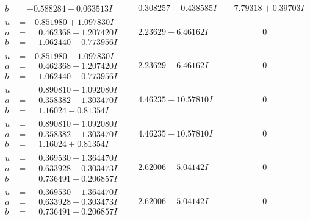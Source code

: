 \documentclass[1p]{elsarticle_modified}
\theoremstyle{definition}
\begin{document}
$$\begin{array}{c|c|c}
\begin{aligned}
b &= -0.588284 - 0.063513 I\end{aligned}
 & \phantom{-}0.308257 - 0.438585 I & \phantom{-}7.79318 + 0.39703 I \\ \hline\begin{aligned}
u &= -0.851980 + 1.097830 I \\
a &= \phantom{-}0.462368 - 1.207420 I \\
b &= \phantom{-}1.062440 + 0.773956 I\end{aligned}
 & \phantom{-}2.23629 - 6.46162 I & \phantom{-0.000000 } 0 \\ \hline\begin{aligned}
u &= -0.851980 - 1.097830 I \\
a &= \phantom{-}0.462368 + 1.207420 I \\
b &= \phantom{-}1.062440 - 0.773956 I\end{aligned}
 & \phantom{-}2.23629 + 6.46162 I & \phantom{-0.000000 } 0 \\ \hline\begin{aligned}
u &= \phantom{-}0.890810 + 1.092080 I \\
a &= \phantom{-}0.358382 + 1.303470 I \\
b &= \phantom{-}1.16024 - 0.81354 I\end{aligned}
 & \phantom{-}4.46235 + 10.57810 I & \phantom{-0.000000 } 0 \\ \hline\begin{aligned}
u &= \phantom{-}0.890810 - 1.092080 I \\
a &= \phantom{-}0.358382 - 1.303470 I \\
b &= \phantom{-}1.16024 + 0.81354 I\end{aligned}
 & \phantom{-}4.46235 - 10.57810 I & \phantom{-0.000000 } 0 \\ \hline\begin{aligned}
u &= \phantom{-}0.369530 + 1.364470 I \\
a &= \phantom{-}0.633928 + 0.303473 I \\
b &= \phantom{-}0.736491 - 0.206857 I\end{aligned}
 & \phantom{-}2.62006 + 5.04142 I & \phantom{-0.000000 } 0 \\ \hline\begin{aligned}
u &= \phantom{-}0.369530 - 1.364470 I \\
a &= \phantom{-}0.633928 - 0.303473 I \\
b &= \phantom{-}0.736491 + 0.206857 I\end{aligned}
 & \phantom{-}2.62006 - 5.04142 I & \phantom{-0.000000 } 0 \\ \hline\begin{aligned}

\end{aligned}
\end{array}$$
\end{document}
